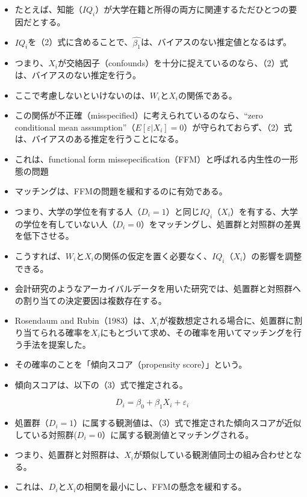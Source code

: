\begin{itemize}
 \item たとえば、知能（$IQ_i$）が大学在籍と所得の両方に関連するただひとつの要因だとする。
 \item $IQ_i$を（2）式に含めることで、$\hat{\beta_1}$は、バイアスのない推定値となるはず。
 \item つまり、$X_i$が交絡因子（confounds）を十分に捉えているのなら、（2）式は、バイアスのない推定を行う。
 \item ここで考慮しないといけないのは、$W_i$と$X_i$の関係である。
 \item この関係が不正確（misspecified）に考えられているのなら、“zero conditional mean assumption”（$E[\varepsilon | X_i] = 0$）が守られておらず、（2）式は、バイアスのある推定を行うことになる。
 \item これは、functional form missepecification（FFM）と呼ばれる内生性の一形態の問題
 \item マッチングは、FFMの問題を緩和するのに有効である。
 \item つまり、大学の学位を有する人（$D_i=1$）と同じ$IQ_i$（$X_i$）を有する、大学の学位を有していない人（$D_i=0$）をマッチングし、処置群と対照群の差異を低下させる。
 \item こうすれば、$W_i$と$X_i$の関係の仮定を置く必要なく、$IQ_i$（$X_i$）の影響を調整できる。
 \item 会計研究のようなアーカイバルデータを用いた研究では、処置群と対照群への割り当ての決定要因は複数存在する。
 \item Rosendaum and Rubin（1983）は、$X_i$が複数想定される場合に、処置群に割り当てられる確率を$X_i$にもとづいて求め、その確率を用いてマッチングを行う手法を提案した。
 \item その確率のことを「傾向スコア（propensity score）」という。
 \item 傾向スコアは、以下の（3）式で推定される。
\end{itemize}

\begin{equation}
D_i = \beta_0 + \beta_1 X_i + \varepsilon_i
\end{equation}

\begin{itemize}
 \item 処置群（$D_i=1$）に属する観測値は、（3）式で推定された傾向スコアが近似している対照群($D_i=0$）に属する観測値とマッチングされる。
 \item つまり、処置群と対照群は、$X_i$が類似している観測値同士の組み合わせとなる。
 \item これは、$D_i$と$X_i$の相関を最小にし、FFMの懸念を緩和する。
\end{itemize}

